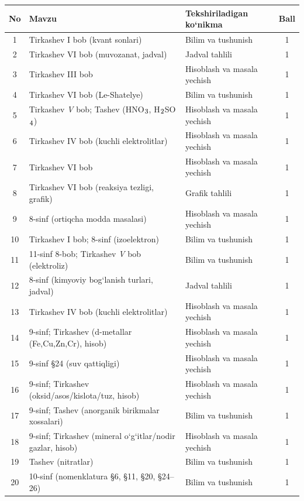 \documentclass[11pt,a4paper]{article}
\renewcommand{\textsubscript}[1]{\ensuremath{_{\text{\fontsize{8}{8}\selectfont #1}}}}
\begin{document}
{\small\noindent\begin{longtable}{|c|p{7.2cm}|p{5.4cm}|c|}\hline \textbf{No} & \textbf{Mavzu} & \textbf{Tekshiriladigan ko`nikma} & \textbf{Ball}\\\hline
1 & Tirkashev I bob (kvant sonlari) & Bilim va tushunish & 1\\\hline
2 & Tirkashev VI bob (muvozanat, jadval) & Jadval tahlili & 1\\\hline
3 & Tirkashev III bob & Hisoblash va masala yechish & 1\\\hline
4 & Tirkashev VI bob (Le-Shatelye) & Bilim va tushunish & 1\\\hline
5 & Tirkashev \textit{V} bob; Tashev (HNO\textsubscript{3}, H\textsubscript{2}SO\textsubscript{4}) & Hisoblash va masala yechish & 1\\\hline
6 & Tirkashev IV bob (kuchli elektrolitlar) & Hisoblash va masala yechish & 1\\\hline
7 & Tirkashev VI bob & Hisoblash va masala yechish & 1\\\hline
8 & Tirkashev VI bob (reaksiya tezligi, grafik) & Grafik tahlili & 1\\\hline
9 & 8-sinf (ortiqcha modda masalasi) & Hisoblash va masala yechish & 1\\\hline
10 & Tirkashev I bob; 8-sinf (izoelektron) & Bilim va tushunish & 1\\\hline
11 & 11-sinf 8-bob; Tirkashev \textit{V} bob (elektroliz) & Bilim va tushunish & 1\\\hline
12 & 8-sinf (kimyoviy bog`lanish turlari, jadval) & Jadval tahlili & 1\\\hline
13 & Tirkashev IV bob (kuchli elektrolitlar) & Hisoblash va masala yechish & 1\\\hline
14 & 9-sinf; Tirkashev (d-metallar (Fe,Cu,Zn,Cr), hisob) & Hisoblash va masala yechish & 1\\\hline
15 & 9-sinf \S{}24 (suv qattiqligi) & Hisoblash va masala yechish & 1\\\hline
16 & 9-sinf; Tirkashev (oksid/asos/kislota/tuz, hisob) & Hisoblash va masala yechish & 1\\\hline
17 & 9-sinf; Tashev (anorganik birikmalar xossalari) & Bilim va tushunish & 1\\\hline
18 & 9-sinf; Tirkashev (mineral o`g`itlar/nodir gazlar, hisob) & Hisoblash va masala yechish & 1\\\hline
19 & Tashev (nitratlar) & Bilim va tushunish & 1\\\hline
20 & 10-sinf (nomenklatura \S{}6, \S{}11, \S{}20, \S{}24--26) & Bilim va tushunish & 1\\\hline

\end{longtable}}
\end{document}
